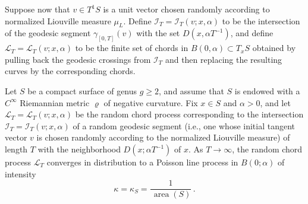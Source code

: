 \documentclass[AHL, Unicode, longabstracts, published]{cedram}
\DeclareMathOperator{\area}{area}
\begin{document}
Suppose now that $v\in T^{1}S$ is a unit vector chosen randomly according to normalized Liouville measure $\mu_{L}$. Define $\mathcal{I}_{T}=\mathcal{I}_{T}(v; x, \alpha)$ to be the intersection of the geodesic segment $\gamma_{[0,T]}(v)$ with the set $D(x,\alpha T^{-1})$, and define $\mathcal{L}_{T}= \mathcal{L}_{T}(v; x, \alpha)$ to be the finite set of chords in $B(0,\alpha)\subset T_{x}S$ obtained by pulling back the geodesic crossings from $\mathcal{I}_{T}$ and then replacing the resulting curves by the corresponding chords.



\begin{theo}\label{theorem:random-local}
Let $S$ be a compact surface of genus $g \geq 2$, and assume that $S$ is endowed with a $C^{\infty}$ Riemannian metric $\varrho$ of negative curvature. Fix $x\in S$ and $\alpha >0$, and let $\mathcal{L}_{T}= \mathcal{L}_{T}(v; x,\alpha)$ be the random chord process corresponding to the intersection $\mathcal{I}_{T}=\mathcal{I}_{T}(v; x, \alpha)$ of a random geodesic segment (i.e., one whose initial tangent vector $v$ is chosen randomly according to the normalized Liouville measure) of length $T$ with the neighborhood $D(x;\alpha T^{-1})$ of $x$. As $T \rightarrow \infty$, the random chord process $\mathcal{L}_{T}$ converges in distribution to a Poisson line process in $B (0;\alpha)$ of intensity
\begin{equation}\label{eq:kappa-S}
\kappa=\kappa_{S}=\frac{1}{\,\area (S)}\,.
\end{equation}
\end{theo}
\end{document}
